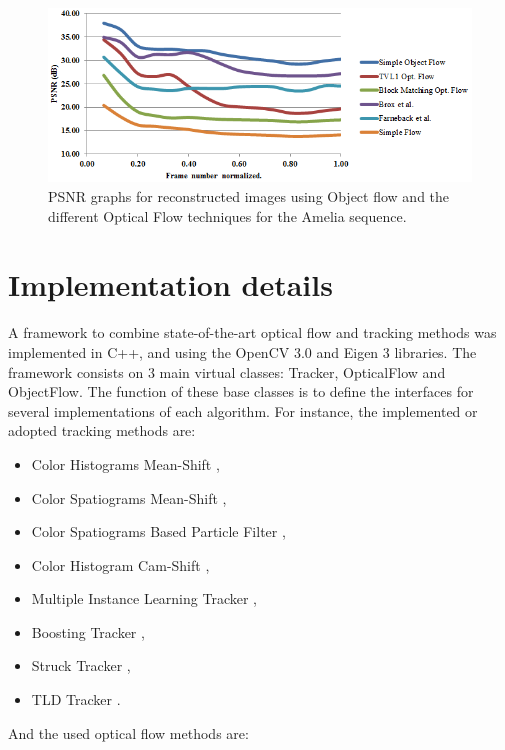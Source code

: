    \begin{figure}[th]
      \centering
      \includegraphics[width=1.0\textwidth]{../images/psnr2.png}
      \caption{PSNR graphs for reconstructed images using Object flow and the different Optical Flow techniques for the Amelia sequence. }
      \label{of_res2}
   \end{figure}

\section{Implementation details}

A framework to combine state-of-the-art optical flow and tracking methods was implemented in C++, and using the OpenCV 3.0 and Eigen 3 libraries. 
The framework consists on 3 main virtual classes: Tracker, 
OpticalFlow and ObjectFlow. The function of these base classes is to define the interfaces for several implementations of each algorithm. For instance, 
the implemented or adopted tracking methods are:

\begin{itemize}
  \item Color Histograms Mean-Shift \cite{c44},
  \item Color Spatiograms Mean-Shift \cite{c46},
  \item Color Spatiograms Based Particle Filter \cite{c46},
  \item Color Histogram Cam-Shift \cite{c45},
  \item Multiple Instance Learning Tracker \cite{c25},
  \item Boosting Tracker \cite{c47},
  \item Struck Tracker \cite{c23},
  \item TLD Tracker \cite{c48}.
\end{itemize}

And the used optical flow methods are:

